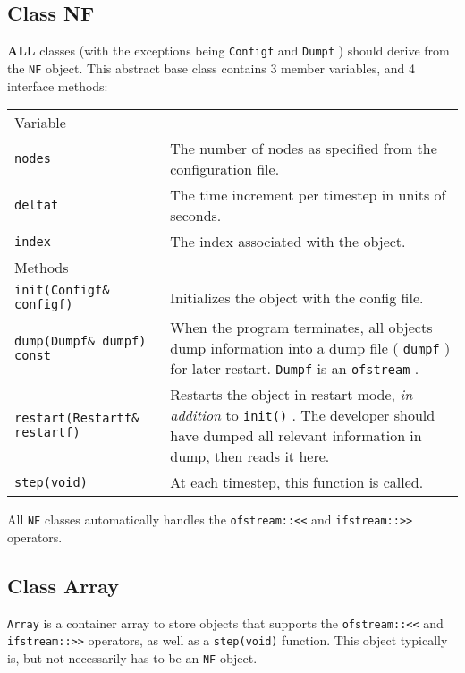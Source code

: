 \documentclass[12pt,a4paper]{article}
\newcommand{\type}[1]{ {\small\small\tt #1} }
\begin{document}

\subsection{Class NF}
\label{sec:nf}

\textbf{ALL} classes (with the exceptions being \type{Configf} and \type{Dumpf}) should derive from the \type{NF} object. This abstract base class contains 3 member variables, and 4 interface methods:

\begin{tabular}{l p{10cm}}
Variable\\[6pt]
\type{nodes}&The number of nodes as specified from the configuration file.\\
\type{deltat}&The time increment per timestep in units of seconds.\\
\type{index}&The index associated with the object.\\[6pt]
Methods\\[6pt]
\type{init(Configf\& configf)}&Initializes the object with the config file.\\
 \type{dump(Dumpf\& dumpf) const}&When the program terminates, all objects dump information into a dump file (\type{dumpf}) for later restart. \type{Dumpf} is an \type{ofstream}.\\
\type{restart(Restartf\& restartf)}&Restarts the object in restart mode, \emph{in addition} to \type{init()}. The developer should have dumped all relevant information in dump, then reads it here.\\
\type{step(void)}&At each timestep, this function is called.\\
\end{tabular}

All \type{NF} classes automatically handles the \type{ofstream::<<} and \type{ifstream::>>} operators.

\subsection{Class Array}
\label{sec:array}

\type{Array} is a container array to store objects that supports the \type{ofstream::<<} and \type{ifstream::>>} operators, as well as a \type{step(void)} function. This object typically is, but not necessarily has to be an \type{NF} object.
\end{document}
